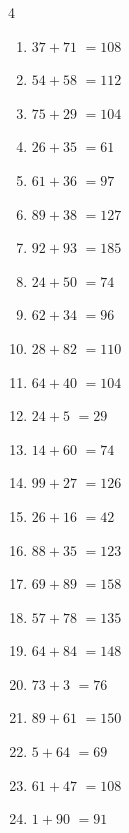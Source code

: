 \begin{multicols}{4}
\begin{enumerate}
  \item $37+71$
        $=108$

  \item $54+58$
        $=112$

  \item $75+29$
        $=104$

  \item $26+35$
        $=61$

  \item $61+36$
        $=97$

  \item $89+38$
        $=127$

  \item $92+93$
        $=185$

  \item $24+50$
        $=74$

  \item $62+34$
        $=96$

  \item $28+82$
        $=110$

  \item $64+40$
        $=104$

  \item $24+5$
        $=29$

  \item $14+60$
        $=74$

  \item $99+27$
        $=126$

  \item $26+16$
        $=42$

  \item $88+35$
        $=123$

  \item $69+89$
        $=158$

  \item $57+78$
        $=135$

  \item $64+84$
        $=148$

  \item $73+3$
        $=76$

  \item $89+61$
        $=150$

  \item $5+64$
        $=69$

  \item $61+47$
        $=108$

  \item $1+90$
        $=91$


\end{enumerate}
\end{multicols}

